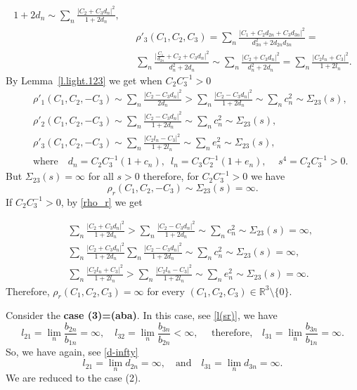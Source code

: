 \documentclass[10pt,a4paper]{amsart}
\begin{document}
\begin{pf}
\begin{eqnarray*}
 {1+2d_{n}}\sim \sum_n\frac{\vert C_2\!+\!C_3d_{n}\vert^2}{1+2d_{n}},\\
&&
\rho'_3(C_1,C_2,C_3)=
\sum_n\frac{\vert C_1\!+\!C_2d_{2n}\!+\!C_3d_{3n}\vert^2}
 {d^2_{3n}+2d_{2n}d_{3n}}=
\\
 &&
\sum_n\frac{\vert \frac{C_1}{d_{2n}}\!+\!C_2\!+\!C_3d_{n}\vert^2}
 {d_n^2+2d_{n}}\sim \sum_n\frac{\vert C_2\!+\!C_3d_{n}\vert^2}{d_n^2+2d_{n}}=\sum_n\frac{\vert C_2l_n\!+\!C_3\vert^2}{1+2l_{n}}.
\end{eqnarray*}
By Lemma~\ref{l.light.123}  we get when $C_2C_3^{-1}>0$
\begin{eqnarray}
\nonumber 
&&
\rho'_1(C_1,C_2,-C_3)\sim  \sum_n\frac{\vert C_2\!-\!C_3d_{n}\vert^2}{2d_{n}}>\sum_n\frac{\vert C_2\!-\!C_3d_{n}\vert^2}{1+2d_{n}}\sim \sum_nc^2_n\sim\Sigma_{23}(s),\\
\label{rho_r}
&&
\rho'_2(C_1,C_2,-C_3)\sim  \sum_n\frac{\vert C_2\!-\!C_3d_{n}\vert^2}{1+2d_{n}}\sim \sum_nc^2_n\sim\Sigma_{23}(s),\\
\nonumber
&&
\rho'_3(C_1,C_2,-C_3)\sim  \sum_n\frac{\vert C_2l_n\!-\!C_3\vert^2}{1+2l_{n}}\sim \sum_ne^2_n\sim\Sigma_{23}(s),\\
\nonumber
&&
\text{where}\quad d_n=
C_2C_3^{-1}(1+c_n),\,\,\,l_n=C_3C_2^{-1}(1+e_n),\quad\,s^4=C_2C_3^{-1}>0.
\end{eqnarray}
But $\Sigma_{23}(s)=\infty$ for all $s>0$ therefore, for $C_2C^{-1}_3>0$ we have
\begin{equation}
\label{(2)}
\rho_r(C_1,C_2,-C_3)\sim  \Sigma_{23}(s)=\infty.
\end{equation}
If $C_2C^{-1}_3>0$, by \eqref{rho_r} we get

\begin{eqnarray*}
\nonumber 
&&
\sum_n\frac{\vert C_2\!+\!C_3d_{n}\vert^2}{1+2d_{n}}>
\sum_n\frac{\vert C_2\!-\!C_3d_{n}\vert^2}{1+2d_{n}}\sim \sum_nc^2_n\sim\Sigma_{23}(s)=\infty,\\
&&
\sum_n\frac{\vert C_2\!+\!C_3d_{n}\vert^2}{1+2d_{n}}
\sum_n\frac{\vert C_2\!-\!C_3d_{n}\vert^2}{1+2d_{n}}\sim \sum_nc^2_n\sim\Sigma_{23}(s)=\infty,\\
\nonumber
&&
\sum_n\frac{\vert C_2l_n\!+\!C_3\vert^2}{1+2l_{n}}> 
\sum_n\frac{\vert C_2l_n\!-\!C_3\vert^2}{1+2l_{n}}\sim \sum_ne^2_n\sim\Sigma_{23}(s)=\infty.
\end{eqnarray*}
Therefore,
$\rho_r(C_1,C_2,C_3)\!=\!\infty$ for every $(C_1,C_2,C_3)\!\in\!\mathbb R^3\setminus \!\{0\}$.

Consider the {\bf case (3)=(aba)}.
In this case, see \eqref{l(sr)}, we have 
$$
l_{21}\!=\!\lim_n\frac{b_{2n}}{b_{1n}}\!=\!\infty,\quad l_{32}\!=\!\lim_n\frac{b_{3n}}{b_{2n}}<\infty,\quad\text{ therefore,}\quad 
l_{31}\!=\!\lim_n\frac{b_{3n}}{b_{1n}}\!=\!\infty.
$$
So, we have again, see \eqref{d-infty}
\begin{equation*}
 l_{21}\!=\!\lim_nd_{2n}=\infty,\quad\text{and}  \quad
l_{31}\!=\!\lim_nd_{3n}=\infty. 
\end{equation*}
We are reduced to the case (2).



\end{pf}
\end{document}
